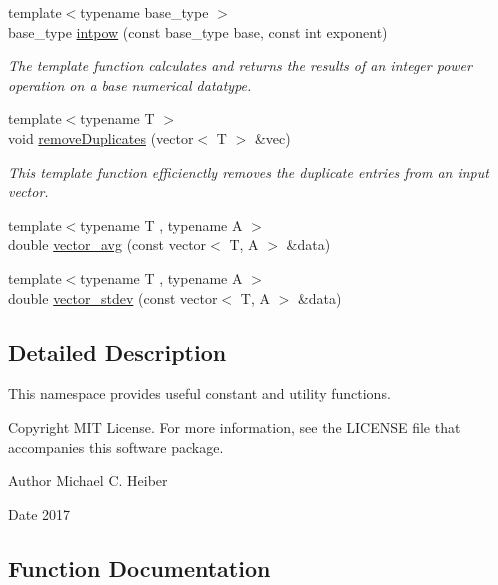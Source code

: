 \begin{DoxyCompactItemize}
{\footnotesize template$<$typename base\+\_\+type $>$ }\\base\+\_\+type \hyperlink{namespace_utils_affd19edaa58a3f8425e1f7b4c9233f8a}{intpow} (const base\+\_\+type base, const int exponent)
\begin{DoxyCompactList}\small\item\em The template function calculates and returns the results of an integer power operation on a base numerical datatype. \end{DoxyCompactList}\item 
{\footnotesize template$<$typename T $>$ }\\void \hyperlink{namespace_utils_ae6b61a9030cf09d8cba2566a42c871df}{remove\+Duplicates} (vector$<$ T $>$ \&vec)
\begin{DoxyCompactList}\small\item\em This template function efficienctly removes the duplicate entries from an input vector. \end{DoxyCompactList}\item 
{\footnotesize template$<$typename T , typename A $>$ }\\double \hyperlink{namespace_utils_aadb08a5b50d04b076f4348a8f752932b}{vector\+\_\+avg} (const vector$<$ T, A $>$ \&data)
\item 
{\footnotesize template$<$typename T , typename A $>$ }\\double \hyperlink{namespace_utils_a04daea5e4b4bb28117b09e1abae4ec5c}{vector\+\_\+stdev} (const vector$<$ T, A $>$ \&data)
\end{DoxyCompactItemize}


\subsection{Detailed Description}
This namespace provides useful constant and utility functions. 

\begin{DoxyCopyright}{Copyright}
M\+IT License. For more information, see the L\+I\+C\+E\+N\+SE file that accompanies this software package. 
\end{DoxyCopyright}
\begin{DoxyAuthor}{Author}
Michael C. Heiber 
\end{DoxyAuthor}
\begin{DoxyDate}{Date}
2017 
\end{DoxyDate}


\subsection{Function Documentation}
\mbox{\label{namespace_utils_aa76a204af4dd4c3eb151691825de2eb2}} 
